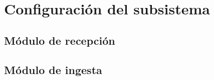 \section{Configuración del subsistema}

\subsection{Módulo de recepción}
\subsection{Módulo de ingesta}

